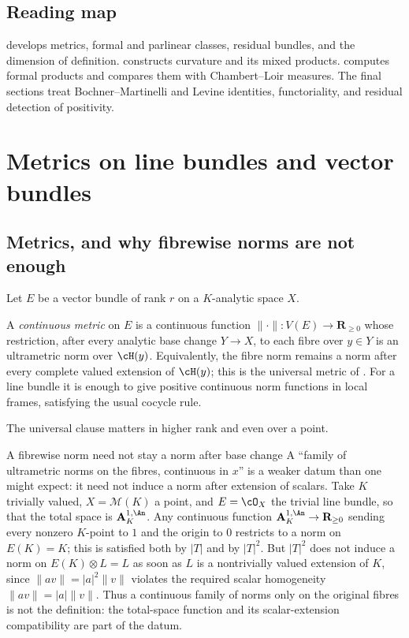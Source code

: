 \subsection{Reading map}
\label{sec:ch17-plan}

 develops metrics, formal and
parlinear classes, residual bundles, and the dimension of definition.
 constructs curvature and
its mixed products.  
computes formal products and compares them with Chambert--Loir measures.
The final sections treat Bochner--Martinelli and Levine identities,
functoriality, and residual detection of positivity.

\section{Metrics on line bundles and vector bundles}
\label{sec:ch17-metrics}

\subsection{Metrics, and why fibrewise norms are not enough}
\label{sec:ch17-metric-definition}

Let $E$ be a vector bundle of rank $r$ on a $K$-analytic space $X$.

\begin{definition}
\label{def:ch17-continuous-metric}
A \emph{continuous metric} on $E$ is a continuous function
$\|\cdot\|:V(E)\to\mathbf R_{\geq0}$ whose restriction, after every
analytic base change $Y\to X$, to each fibre over $y\in Y$ is an
ultrametric norm over $\cH(y)$.  Equivalently, the fibre norm remains a
norm after every complete valued extension of $\cH(y)$; this is the
universal metric of \cite[Definition~17.1.2]{CLD25}.  For a line bundle it
is enough to give positive continuous norm functions in local frames,
satisfying the usual cocycle rule.
\end{definition}

The universal clause matters in higher rank and even over a point.

\begin{warning}{A fibrewise norm need not stay a norm after base change}
A ``family of ultrametric norms on the fibres, continuous in $x$'' is a
weaker datum than one might expect: it need not induce a norm after
extension of scalars.  Take $K$ trivially valued, $X=\mathcal M(K)$ a
point, and $E=\cO_X$ the trivial line bundle, so that the total space is
$\mathbf A^{1,\An}_K$.  Any continuous function
$\mathbf A^{1,\An}_K\to\mathbf R_{\ge0}$ sending every nonzero $K$-point
to $1$ and the origin to $0$ restricts to a norm on $E(K)=K$; this is
satisfied both by $|T|$ and by $|T|^2$.  But $|T|^2$ does not induce a
norm on $E(K)\otimes L=L$ as soon as $L$ is a nontrivially valued
extension of $K$, since $\|av\|=|a|^2\|v\|$ violates the required
scalar homogeneity $\|av\|=|a|\|v\|$.  Thus a continuous
family of norms only on the original fibres is not the definition: the
total-space function and its scalar-extension compatibility are part of the
datum.
\end{warning}

